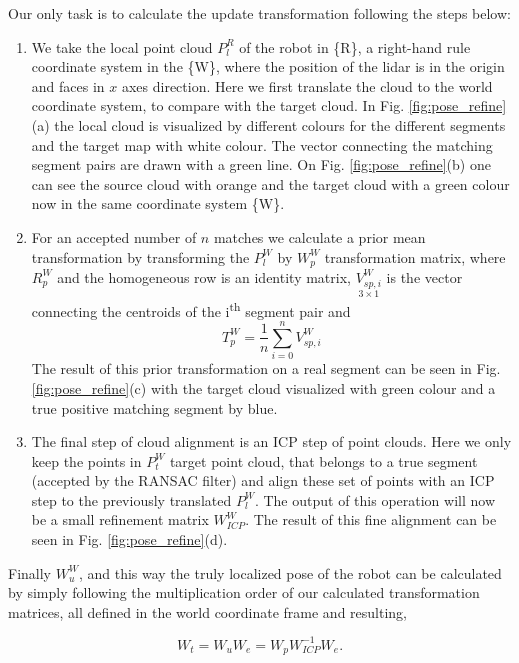 \documentclass[letterpaper, 10 pt, conference]{ieeeconf}  %
\begin{document}
Our only task is to calculate the update transformation following the steps below:
\begin{enumerate}
    \item We take the local point cloud $P_l^R$ of the robot in \{R\}, a right-hand rule coordinate system in the \{W\}, where the position of the lidar is in the origin and faces in $x$ axes direction. Here we first translate the cloud to the world coordinate system, to compare with the target cloud. In Fig. \ref{fig:pose_refine}(a) the local cloud is visualized by different colours for the different segments and the target map with white colour. The vector connecting the matching segment pairs are drawn with a green line. On Fig. \ref{fig:pose_refine}(b) one can see the source cloud with orange and the target cloud with a green colour now in the same coordinate system \{W\}. 
    \item For an accepted number of $n$ matches we calculate a prior mean transformation by transforming the $P_l^W$ by $W_p^W$ transformation matrix, where $R_p^W$ and the homogeneous row is an identity matrix, $\underset{3\times 1}{V_{sp,i}^W}$ is the vector connecting the centroids of the i\textsuperscript{th} segment pair and
    \begin{equation}
        T_p^W=\frac{1}{n}\sum_{i=0}^n V_{sp,i}^W
    \end{equation}
    The result of this prior transformation on a real segment can be seen in Fig. \ref{fig:pose_refine}(c) with the target cloud visualized with green colour and a true positive matching segment by blue. 
    \item The final step of cloud alignment is an ICP step of point clouds. Here we only keep the points in $P_t^W$ target point cloud, that belongs to a true segment (accepted by the RANSAC filter) and align these set of points with an ICP step to the previously translated $P_l^W$. The output of this operation will now be a small refinement matrix $W_{ICP}^W$. The result of this fine alignment can be seen in Fig. \ref{fig:pose_refine}(d). 
\end{enumerate}

Finally $W_u^W$, and this way the truly localized pose of the robot can be calculated by simply following the multiplication order of our calculated transformation matrices, all defined in the world coordinate frame and resulting,

\begin{equation}
    W_t=W_u  W_e =  W_p W_{ICP}^{-1} W_e.
\end{equation}
\end{document}
